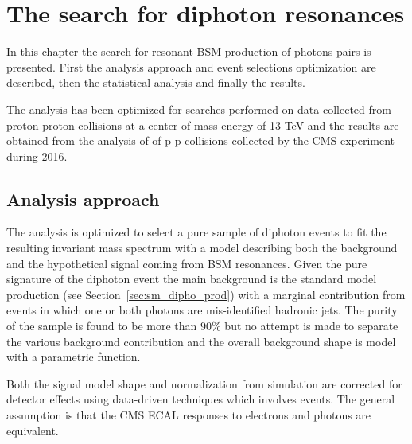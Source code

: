 \chapter{The search for diphoton resonances}
\label{chapter:diphotons}

In this chapter the search for resonant BSM production of photons pairs is presented.
First the analysis approach and event selections optimization are described, then
the statistical analysis and finally the results.

The analysis has been optimized for searches performed on data collected from proton-proton
collisions at a center of mass energy of 13 TeV and the results are obtained from the analysis
of \lumisix of p-p collisions collected by the CMS experiment during 2016. 


\section{Analysis approach}
The analysis is optimized to select a pure sample of diphoton events to fit the resulting
invariant mass spectrum with a model describing both the background and the hypothetical signal
coming from BSM resonances. Given the pure signature of the diphoton event the main background
is the standard model production (see Section~\ref{sec:sm_dipho_prod}) with a marginal contribution
from events in which one or both photons are mis-identified hadronic jets. The purity of the sample
is found to be more than $90\%$ but no attempt is made to separate the various background contribution
and the overall background shape is model with a parametric function.

Both the signal model shape and normalization from simulation are corrected for detector effects using
data-driven techniques which involves \Zee events. The general assumption is that the CMS ECAL
responses to electrons and photons are equivalent. 

